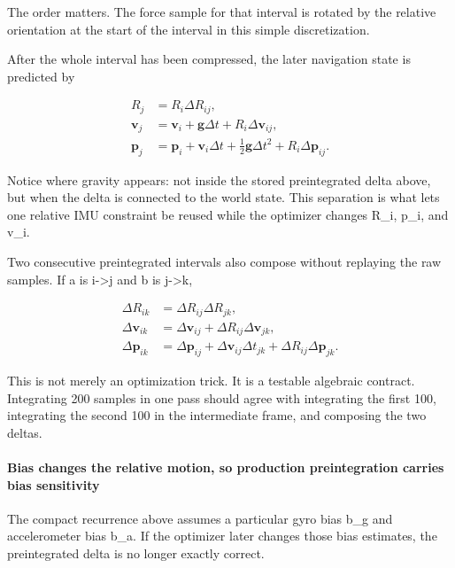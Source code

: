The order matters. The force sample for that interval is rotated by the relative orientation at the start of the interval in this simple discretization.

After the whole interval has been compressed, the later navigation state is predicted by

\[
\begin{aligned}
R_j &= R_i\Delta R_{ij},\\
\mathbf v_j &= \mathbf v_i+\mathbf g\Delta t+R_i\Delta\mathbf v_{ij},\\
\mathbf p_j &= \mathbf p_i+\mathbf v_i\Delta t+\tfrac12\mathbf g\Delta t^2+R_i\Delta\mathbf p_{ij}.
\end{aligned}
\]

Notice where gravity appears: not inside the stored preintegrated delta above, but when the delta is connected to the world state. This separation is what lets one relative IMU constraint be reused while the optimizer changes R\_i, p\_i, and v\_i.

Two consecutive preintegrated intervals also compose without replaying the raw samples. If a is i-\textgreater j and b is j-\textgreater k,

\[
\begin{aligned}
\Delta R_{ik}&=\Delta R_{ij}\Delta R_{jk},\\
\Delta\mathbf v_{ik}&=\Delta\mathbf v_{ij}+\Delta R_{ij}\Delta\mathbf v_{jk},\\
\Delta\mathbf p_{ik}&=\Delta\mathbf p_{ij}+\Delta\mathbf v_{ij}\Delta t_{jk}+\Delta R_{ij}\Delta\mathbf p_{jk}.
\end{aligned}
\]

This is not merely an optimization trick. It is a testable algebraic contract. Integrating 200 samples in one pass should agree with integrating the first 100, integrating the second 100 in the intermediate frame, and composing the two deltas.

\paragraph{Bias changes the relative motion, so production preintegration carries bias sensitivity}\label{04-visual-computing-ii-ch035-bias-changes-the-relative-motion-so-production-preintegration-carries-bias-sensitivity}

The compact recurrence above assumes a particular gyro bias b\_g and accelerometer bias b\_a. If the optimizer later changes those bias estimates, the preintegrated delta is no longer exactly correct.


